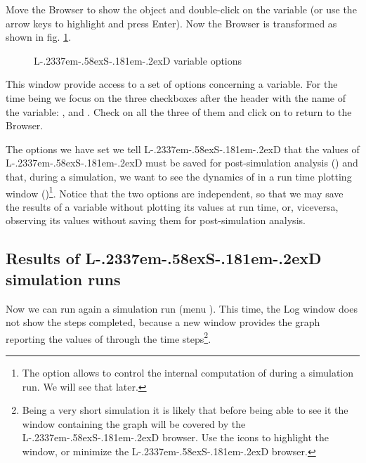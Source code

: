 \documentclass [11pt,a4paper] {book}
\def\LsD{{L\kern-.2337em\lower-.58ex\hbox{S}\kern-.181em\lower-.2ex\hbox{D}}\xspace}
\begin{document}
 Move the Browser to show the object
 and double-click on the variable  (or use the arrow keys to highlight
and press Enter). Now the Browser is transformed as shown in fig. \ref{fig:variable}.

\begin{figure}[ht]
  \centering
  \caption{\LsD variable options}
  \label{fig:variable}
\end{figure}

This window provide access to a set of options concerning a variable. For the time
being we focus on the three checkboxes after the header with the name of the variable:
,  and . Check on all the three of them and
click on  to return to the Browser.

The options we have set we tell \LsD that the values of \LsD must be saved for
post-simulation analysis () and that, during a simulation, we want to see the
dynamics of  in a run time plotting window ()\footnote{The
 option allows to control the internal computation of  during a simulation
run. We will see that later.}. Notice that the two options are independent, so that we
may save the results of a variable without plotting its values at run time, or,
viceversa, observing its values without saving them for post-simulation analysis.

\subsection{Results of \LsD simulation runs}


Now we can run again a simulation run (menu ). This time, the Log window
does not show the steps completed, because a new window provides the graph reporting the
values of  through the time steps\footnote{Being a very short simulation it is likely that before being able to see it the window containing the graph will be covered by the \LsD browser. Use the icons to highlight the window, or minimize the \LsD browser.}. 
\end{document}
